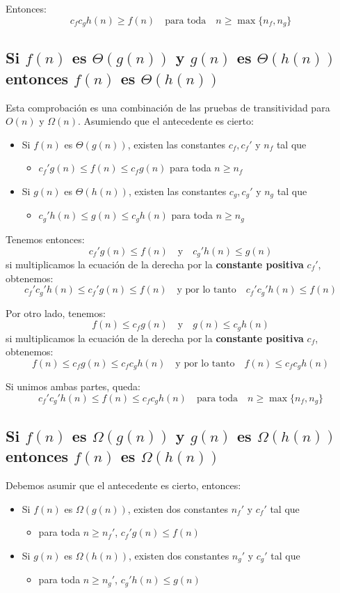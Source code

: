 \documentclass[letterpaper, 12pt]{article}
\newcommand{\parg}{\par \hfill \break}
\begin{document}
\noindent
Entonces:
$$
c_f c_g h(n) \geq f(n) \quad \mbox{para toda} \quad n \geq \max\{n_f, n_g\}
$$
\subsection{Si \(f(n)\) es \(\Theta(g(n))\) y \(g(n)\) es \(\Theta(h(n))\) entonces \(f(n)\) es \(\Theta(h(n))\)}
\label{sec:org588fd80}
Esta comprobación es una combinación de las pruebas de transitividad para \(O(n)\)
y \(\Omega(n)\). Asumiendo que el antecedente es cierto:
\begin{itemize}
\item Si \(f(n)\) es \(\Theta(g(n))\), existen las constantes \(c_f, c_f'\) y \(n_f\) tal que
\begin{itemize}
\item \(c_f' g(n) \leq f(n) \leq c_f g(n)\) para toda \(n \geq n_f\)
\end{itemize}
\item Si \(g(n)\) es \(\Theta(h(n))\), existen las constantes \(c_g, c_g'\) y \(n_g\) tal que
\begin{itemize}
\item \(c_g' h(n) \leq g(n) \leq c_g h(n)\) para toda \(n \geq n_g\)
\end{itemize}
\end{itemize}
\parg
Tenemos entonces:
$$
c_f' g(n) \leq f(n) \quad \mbox{y} \quad c_g' h(n) \leq g(n)
$$
si multiplicamos la ecuación de la derecha por la \textbf{constante positiva} \(c_f'\),
obtenemos:
$$
c_f' c_g' h(n) \leq c_f' g(n) \leq f(n) \quad \mbox{y por lo tanto} \quad
c_f' c_g' h(n) \leq f(n)
$$
\parg
\noindent
Por otro lado, tenemos:
$$
f(n) \leq  c_f g(n) \quad \mbox{y} \quad g(n) \leq c_g h(n)
$$
si multiplicamos la ecuación de la derecha por la \textbf{constante positiva} \(c_f\),
obtenemos:
$$
f(n) \leq c_f g(n) \leq c_f c_g h(n) \quad \mbox{y por lo tanto} \quad
f(n) \leq c_f c_g h(n)
$$
\parg

\noindent
Si unimos ambas partes, queda:
$$
c_f' c_g' h(n) \leq f(n) \leq c_f c_g h(n) \quad \mbox{para toda} \quad
n \geq \max\{n_f, n_g\}
$$
\subsection{Si \(f(n)\) es \(\Omega(g(n))\) y \(g(n)\) es \(\Omega(h(n))\) entonces \(f(n)\) es \(\Omega(h(n))\)}
\label{sec:org169c466}
Debemos asumir que el antecedente es cierto, entonces:
\begin{itemize}
\item Si \(f(n)\) es \(\Omega(g(n))\), existen dos constantes \(n_f'\) y \(c_f'\) tal que
\begin{itemize}
\item para toda \(n \geq n_f'\), \(c_f' g(n) \leq f(n)\)
\end{itemize}
\item Si \(g(n)\) es \(\Omega(h(n))\), existen dos constantes \(n_g'\) y \(c_g'\) tal que
\begin{itemize}
\item para toda \(n \geq n_g'\), \(c_g' h(n) \leq g(n)\)
\end{itemize}
\end{itemize}
\end{document}
